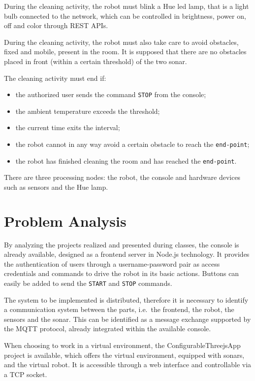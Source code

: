During the cleaning activity, the robot must blink a Hue led lamp, that is a light bulb connected to the network, which can be controlled in brightness, power on, off and color through REST APIs.

During the cleaning activity, the robot must also take care to avoid obstacles, fixed and mobile, present in the room. It is supposed that there are no obstacles placed in front (within a certain threshold) of the two sonar.

The cleaning activity must end if:
\begin{itemize}
	\item the authorized user sends the command \texttt{STOP} from the console;
	\item the ambient temperature exceeds the threshold;
	\item the current time exits the interval;
	\item the robot cannot in any way avoid a certain obstacle to reach the \texttt{end-point};
	\item the robot has finished cleaning the room and has reached the \texttt{end-point}.
\end{itemize}

There are three processing nodes: the robot, the console and hardware devices such as sensors and the Hue lamp.

\section{Problem Analysis}
By analyzing the projects realized and presented during classes, the console is already available, designed as a frontend server in Node.js technology. It provides the authentication of users through a username-password pair as access credentials and commands to drive the robot in its basic actions. Buttons can easily be added to send the \texttt{START} and \texttt{STOP} commands.

The system to be implemented is distributed, therefore it is necessary to identify a communication system between the parts, i.e.\ the frontend, the robot, the sensors and the sonar. This can be identified as a message exchange supported by the MQTT protocol, already integrated within the available console.

When choosing to work in a virtual environment, the ConfigurableThreejsApp project is available, which offers the virtual environment, equipped with sonars, and the virtual robot. It is accessible through a web interface and controllable via a TCP socket.

